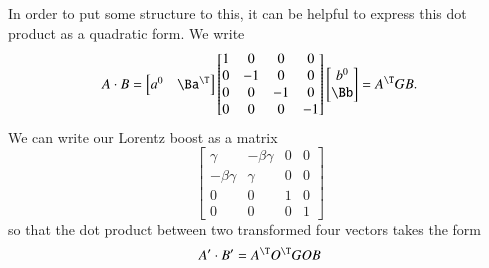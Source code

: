 In order to put some structure to this, it can be helpful to express this dot product as a quadratic form.  We write
%
\begin{equation}\label{eqn:relativisticElectrodynamicsT1:100}
\begin{aligned}
A \cdot B =
\begin{bmatrix}
a^0 & \Ba^\T
\end{bmatrix}
\begin{bmatrix}
1 & 0 & 0 & 0 \\
0 & -1 & 0 & 0 \\
0 & 0 & -1 & 0 \\
0 & 0 & 0 & -1
\end{bmatrix}
\begin{bmatrix}
b^0 \\
\Bb
\end{bmatrix}
= A^\T G B.
\end{aligned}
\end{equation}
%
We can write our Lorentz boost as a matrix
%
\begin{equation}\label{eqn:relativisticElectrodynamicsT1:110}
\begin{bmatrix}
\gamma & -\beta \gamma & 0 & 0 \\
-\beta \gamma & \gamma & 0 & 0 \\
0 & 0 & 1 & 0 \\
0 & 0 & 0 & 1
\end{bmatrix}
\end{equation}
%
so that the dot product between two transformed four vectors takes the form
%
\begin{equation}\label{eqn:relativisticElectrodynamicsT1:120}
A' \cdot B' = A^\T O^\T G O B
\end{equation}
